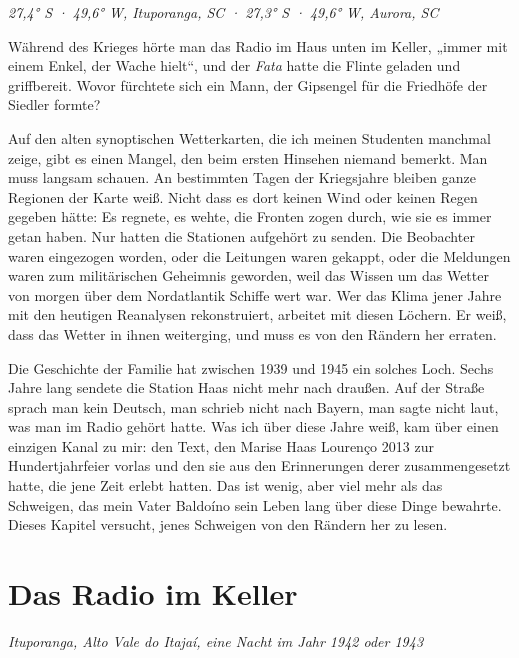 \documentclass[
  ngerman,
  11pt,
  openany]{book}
\begin{document}
\emph{27,4° S · 49,6° W, Ituporanga, SC · 27,3° S · 49,6° W, Aurora, SC}

Während des Krieges hörte man das Radio im Haus unten im Keller, „immer
mit einem Enkel, der Wache hielt``, und der \emph{Fata} hatte die Flinte
geladen und griffbereit. Wovor fürchtete sich ein Mann, der Gipsengel
für die Friedhöfe der Siedler formte?

Auf den alten synoptischen Wetterkarten, die ich meinen Studenten
manchmal zeige, gibt es einen Mangel, den beim ersten Hinsehen niemand
bemerkt. Man muss langsam schauen. An bestimmten Tagen der Kriegsjahre
bleiben ganze Regionen der Karte weiß. Nicht dass es dort keinen Wind
oder keinen Regen gegeben hätte: Es regnete, es wehte, die Fronten zogen
durch, wie sie es immer getan haben. Nur hatten die Stationen aufgehört
zu senden. Die Beobachter waren eingezogen worden, oder die Leitungen
waren gekappt, oder die Meldungen waren zum militärischen Geheimnis
geworden, weil das Wissen um das Wetter von morgen über dem Nordatlantik
Schiffe wert war. Wer das Klima jener Jahre mit den heutigen Reanalysen
rekonstruiert, arbeitet mit diesen Löchern. Er weiß, dass das Wetter in
ihnen weiterging, und muss es von den Rändern her erraten.

Die Geschichte der Familie hat zwischen 1939 und 1945 ein solches Loch.
Sechs Jahre lang sendete die Station Haas nicht mehr nach draußen. Auf
der Straße sprach man kein Deutsch, man schrieb nicht nach Bayern, man
sagte nicht laut, was man im Radio gehört hatte. Was ich über diese
Jahre weiß, kam über einen einzigen Kanal zu mir: den Text, den Marise
Haas Lourenço 2013 zur Hundertjahrfeier vorlas und den sie aus den
Erinnerungen derer zusammengesetzt hatte, die jene Zeit erlebt hatten.
Das ist wenig, aber viel mehr als das Schweigen, das mein Vater Baldoíno
sein Leben lang über diese Dinge bewahrte. Dieses Kapitel versucht,
jenes Schweigen von den Rändern her zu lesen.

\section{Das Radio im Keller}\label{das-radio-im-keller}

\emph{Ituporanga, Alto Vale do Itajaí, eine Nacht im Jahr 1942 oder
1943}
\end{document}
